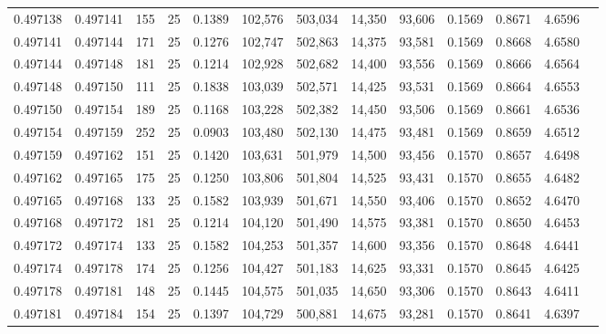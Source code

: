 \begin{tabular}{rrrrrrrrrrrrr}
0.497138 & 0.497141 & 155 &  25 &                                     0.1389 & 102,576 & 503,034 &  14,350 &  93,606 & 0.1569 & 0.8671 & 4.6596 \\
0.497141 & 0.497144 & 171 &  25 &                                     0.1276 & 102,747 & 502,863 &  14,375 &  93,581 & 0.1569 & 0.8668 & 4.6580 \\
0.497144 & 0.497148 & 181 &  25 &                                     0.1214 & 102,928 & 502,682 &  14,400 &  93,556 & 0.1569 & 0.8666 & 4.6564 \\
0.497148 & 0.497150 & 111 &  25 &                                     0.1838 & 103,039 & 502,571 &  14,425 &  93,531 & 0.1569 & 0.8664 & 4.6553 \\
0.497150 & 0.497154 & 189 &  25 &                                     0.1168 & 103,228 & 502,382 &  14,450 &  93,506 & 0.1569 & 0.8661 & 4.6536 \\
0.497154 & 0.497159 & 252 &  25 &                                     0.0903 & 103,480 & 502,130 &  14,475 &  93,481 & 0.1569 & 0.8659 & 4.6512 \\
0.497159 & 0.497162 & 151 &  25 &                                     0.1420 & 103,631 & 501,979 &  14,500 &  93,456 & 0.1570 & 0.8657 & 4.6498 \\
0.497162 & 0.497165 & 175 &  25 &                                     0.1250 & 103,806 & 501,804 &  14,525 &  93,431 & 0.1570 & 0.8655 & 4.6482 \\
0.497165 & 0.497168 & 133 &  25 &                                     0.1582 & 103,939 & 501,671 &  14,550 &  93,406 & 0.1570 & 0.8652 & 4.6470 \\
0.497168 & 0.497172 & 181 &  25 &                                     0.1214 & 104,120 & 501,490 &  14,575 &  93,381 & 0.1570 & 0.8650 & 4.6453 \\
0.497172 & 0.497174 & 133 &  25 &                                     0.1582 & 104,253 & 501,357 &  14,600 &  93,356 & 0.1570 & 0.8648 & 4.6441 \\
0.497174 & 0.497178 & 174 &  25 &                                     0.1256 & 104,427 & 501,183 &  14,625 &  93,331 & 0.1570 & 0.8645 & 4.6425 \\
0.497178 & 0.497181 & 148 &  25 &                                     0.1445 & 104,575 & 501,035 &  14,650 &  93,306 & 0.1570 & 0.8643 & 4.6411 \\
0.497181 & 0.497184 & 154 &  25 &                                     0.1397 & 104,729 & 500,881 &  14,675 &  93,281 & 0.1570 & 0.8641 & 4.6397 \\

\end{tabular}
